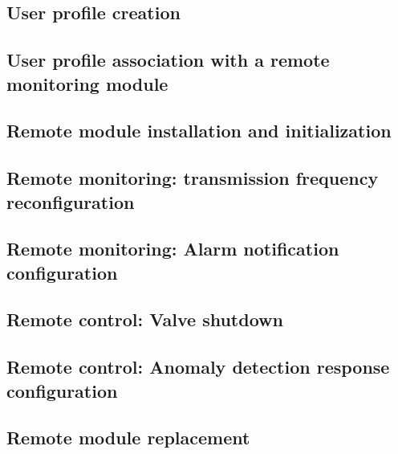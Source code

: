 \subsection{User profile creation}
\label{uc-user-profile-creation}


\subsection{User profile association with a remote monitoring module}
\label{uc-user-profile-association}


\subsection{Remote module installation and initialization}
\label{uc-remote-module-installation}


\subsection{Remote monitoring: transmission frequency reconfiguration}
\label{uc-remote-monitoring-frequency-reconfiguration}


\subsection{Remote monitoring: Alarm notification configuration}
\label{uc-remote-monitoring-notification-config}


\subsection{Remote control: Valve shutdown}
\label{uc-remote-control-valve-shutdown}


\subsection{Remote control: Anomaly detection response configuration}
\label{uc-remote-control-anomaly-detection-response-config}


\subsection{Remote module replacement}
\label{uc-remote-module-replacement}


